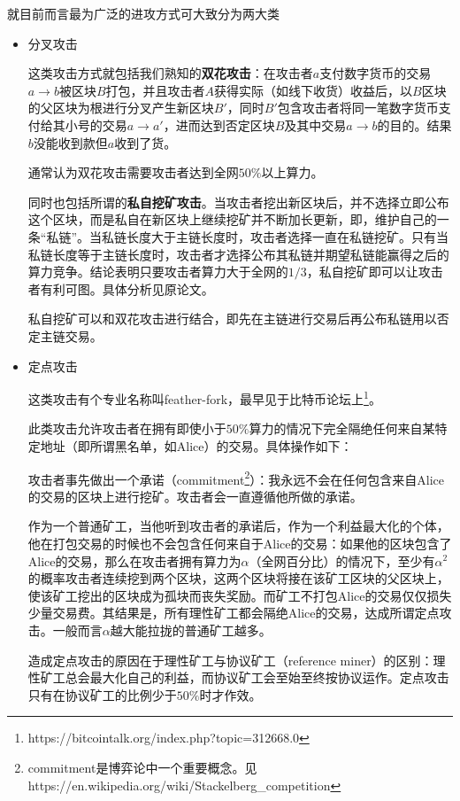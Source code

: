 就目前而言最为广泛的进攻方式可大致分为两大类
\begin{itemize}
	\item 分叉攻击
	
	这类攻击方式就包括我们熟知的\textbf{双花攻击}：在攻击者$a$支付数字货币的交易$a\rightarrow b$被区块$B$打包，并且攻击者$A$获得实际（如线下收货）收益后，以$B$区块的父区块为根进行分叉产生新区块$B'$，同时$B'$包含攻击者将同一笔数字货币支付给其小号的交易$a\rightarrow a'$，进而达到否定区块$B$及其中交易$a\rightarrow b$的目的。结果$b$没能收到款但$a$收到了货。
	
	通常认为双花攻击需要攻击者达到全网$50\%$以上算力。
	
	同时也包括所谓的\textbf{私自挖矿攻击}。当攻击者挖出新区块后，并不选择立即公布这个区块，而是私自在新区块上继续挖矿并不断加长更新，即，维护自己的一条“私链”。当私链长度大于主链长度时，攻击者选择一直在私链挖矿。只有当私链长度等于主链长度时，攻击者才选择公布其私链并期望私链能赢得之后的算力竞争。结论表明只要攻击者算力大于全网的$1/3$，私自挖矿即可以让攻击者有利可图。具体分析见原论文\cite{eyal2018majority}。
	
	私自挖矿可以和双花攻击进行结合，即先在主链进行交易后再公布私链用以否定主链交易。
	
	\item 定点攻击
	
	这类攻击有个专业名称叫feather-fork，最早见于比特币论坛上\footnote{https://bitcointalk.org/index.php?topic=312668.0}。
	
	此类攻击允许攻击者在拥有即使小于$50\%$算力的情况下完全隔绝任何来自某特定地址（即所谓黑名单，如Alice）的交易。具体操作如下：
	
	攻击者事先做出一个承诺（commitment\footnote{commitment是博弈论中一个重要概念。见https://en.wikipedia.org/wiki/Stackelberg\_competition}）：我永远不会在任何包含来自Alice的交易的区块上进行挖矿。攻击者会一直遵循他所做的承诺。
	
	作为一个普通矿工，当他听到攻击者的承诺后，作为一个利益最大化的个体，他在打包交易的时候也不会包含任何来自于Alice的交易：如果他的区块包含了Alice的交易，那么在攻击者拥有算力为$\alpha$（全网百分比）的情况下，至少有$\alpha^2$的概率攻击者连续挖到两个区块，这两个区块将接在该矿工区块的父区块上，使该矿工挖出的区块成为孤块而丧失奖励。而矿工不打包Alice的交易仅仅损失少量交易费。其结果是，所有理性矿工都会隔绝Alice的交易，达成所谓定点攻击。一般而言$\alpha$越大能拉拢的普通矿工越多。
	
	造成定点攻击的原因在于理性矿工与协议矿工（reference miner）的区别：理性矿工总会最大化自己的利益，而协议矿工会至始至终按协议运作。定点攻击只有在协议矿工的比例少于$50\%$时才作效。
	

\end{itemize}
